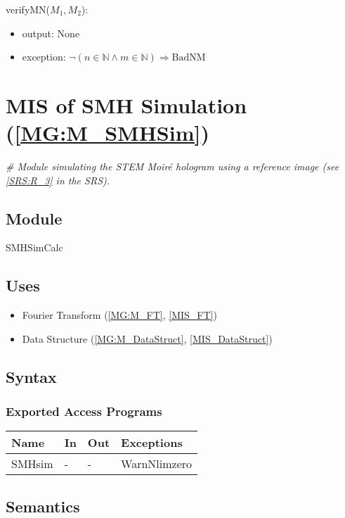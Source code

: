 \documentclass[12pt, titlepage]{article}
\begin{document}
\noindent verifyMN($M_1,M_2$):
\begin{itemize}
\item output: None
\item exception:\newline
$\neg (n \in \mathbb{N} \wedge m \in \mathbb{N}) \Rightarrow \text{BadNM}$
\end{itemize}

\section{MIS of SMH Simulation (\texorpdfstring{\cref{MG:M_SMHSim}}))} 
\label{MIS_SMHSim}

\noindent\textit{{\#} Module simulating the STEM Moir{\'e} hologram using a 
reference image (see \cref{SRS:R_3} in the SRS).}

\subsection{Module}
SMHSimCalc
\subsection{Uses}
\begin{itemize}
\item Fourier Transform (\cref{MG:M_FT}, \cref{MIS_FT})
\item Data Structure (\cref{MG:M_DataStruct}, \cref{MIS_DataStruct})
\end{itemize}

\subsection{Syntax}

\subsubsection{Exported Access Programs}

\begin{center}
\begin{tabular}{p{3cm} p{3cm} p{3cm} p{4cm}}
\hline
\textbf{Name} & \textbf{In} & \textbf{Out} & \textbf{Exceptions} \\
\hline
SMHsim & - & - & WarnNlimzero\\
\hline
\end{tabular}
\end{center}

\subsection{Semantics}
\end{document}
